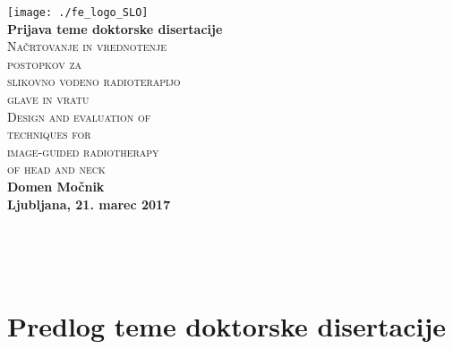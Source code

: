 \documentclass[a4paper,twoside,11pt]{article}
\begin{document}
	\thispagestyle{empty}
	\par{ \noindent
		\begin{center}
			\texttt{[image: ./fe\_logo\_SLO]} \\ \vspace{2.0cm}
			\textbf{\Large Prijava teme doktorske disertacije} \\ \vspace{2.0cm}
			\textsc{\Huge Načrtovanje in vrednotenje} \\ \vspace{0.5cm}
			\textsc{\Huge postopkov za} \\ \vspace{0.5cm}
			\textsc{\Huge slikovno vodeno radioterapijo} \\ \vspace{0.5cm}
			\textsc{\Huge glave in vratu} \\ \vspace{1.0cm}
			\textsc{\Huge Design and evaluation of} \\ \vspace{0.5cm}
			\textsc{\Huge techniques for} \\ \vspace{0.5cm}
			\textsc{\Huge image-guided radiotherapy} \\ \vspace{0.5cm}
			\textsc{\Huge of head and neck} \\ \vspace{2.2cm}
			\textbf{\Large Domen Močnik} \\ \vspace{2.0cm}
			\textbf{\large Ljubljana, 21. marec 2017 }
		\end{center}
	}
	\newpage
	\thispagestyle{empty}
	~\\
	\newpage
	
	
	\thispagestyle{empty}
	\renewcommand\contentsname{Vsebina}
	\tableofcontents
	\newpage
	\thispagestyle{empty}
	~\\
	\newpage
	
	
	\section{Predlog teme doktorske disertacije}
\end{document}
